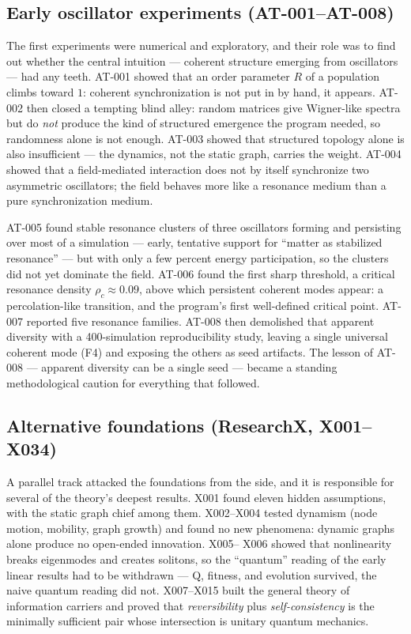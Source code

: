 \documentclass[10pt,twoside,openany]{book}
\begin{document}
\subsection{Early oscillator experiments (AT-001--AT-008)}

The first experiments were numerical and exploratory, and their role was to find out
whether the central intuition --- coherent structure emerging from oscillators --- had any
teeth. AT-001 showed that an order parameter $R$ of a population climbs toward $1$:
coherent synchronization is not put in by hand, it appears. AT-002 then closed a tempting
blind alley: random matrices give Wigner-like spectra but do \emph{not} produce the kind
of structured emergence the program needed, so randomness alone is not enough. AT-003
showed that structured topology alone is also insufficient --- the dynamics, not the
static graph, carries the weight. AT-004 showed that a field-mediated interaction does
not by itself synchronize two asymmetric oscillators; the field behaves more like a
resonance medium than a pure synchronization medium.

AT-005 found stable resonance clusters of three oscillators forming and persisting over
most of a simulation --- early, tentative support for ``matter as stabilized resonance''
--- but with only a few percent energy participation, so the clusters did not yet dominate
the field. AT-006 found the first sharp threshold, a critical resonance density
$\rho_c\approx0.09$, above which persistent coherent modes appear: a percolation-like
transition, and the program's first well-defined critical point. AT-007 reported five
resonance families. AT-008 then demolished that apparent diversity with a
400-simulation reproducibility study, leaving a single universal coherent mode (F4) and
exposing the others as seed artifacts. The lesson of AT-008 --- apparent diversity can be
a single seed --- became a standing methodological caution for everything that followed.

\subsection{Alternative foundations (ResearchX, X001--X034)}

A parallel track attacked the foundations from the side, and it is responsible for several
of the theory's deepest results. X001 found eleven hidden assumptions, with the static
graph chief among them. X002--X004 tested dynamism (node motion, mobility, graph growth)
and found no new phenomena: dynamic graphs alone produce no open-ended innovation. X005--
X006 showed that nonlinearity breaks eigenmodes and creates solitons, so the ``quantum''
reading of the early linear results had to be withdrawn --- Q, fitness, and evolution
survived, the naive quantum reading did not. X007--X015 built the general theory of
information carriers and proved that \emph{reversibility} plus \emph{self-consistency} is
the minimally sufficient pair whose intersection is unitary quantum mechanics.
\end{document}
